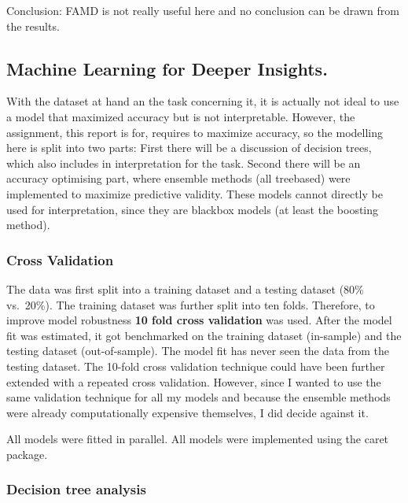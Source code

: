 \documentclass[
]{article}
\begin{document}
Conclusion: FAMD is not really useful here and no conclusion can be
drawn from the results.

\hypertarget{machine-learning-for-deeper-insights.}{%
\subsection{Machine Learning for Deeper
Insights.}\label{machine-learning-for-deeper-insights.}}

With the dataset at hand an the task concerning it, it is actually not
ideal to use a model that maximized accuracy but is not interpretable.
However, the assignment, this report is for, requires to maximize
accuracy, so the modelling here is split into two parts: First there
will be a discussion of decision trees, which also includes in
interpretation for the task. Second there will be an accuracy optimising
part, where ensemble methods (all treebased) were implemented to
maximize predictive validity. These models cannot directly be used for
interpretation, since they are blackbox models (at least the boosting
method).

\hypertarget{cross-validation}{%
\subsubsection{Cross Validation}\label{cross-validation}}

The data was first split into a training dataset and a testing dataset
(80\% vs.~20\%). The training dataset was further split into ten folds.
Therefore, to improve model robustness \textbf{10 fold cross validation}
was used. After the model fit was estimated, it got benchmarked on the
training dataset (in-sample) and the testing dataset (out-of-sample).
The model fit has never seen the data from the testing dataset. The
10-fold cross validation technique could have been further extended with
a repeated cross validation. However, since I wanted to use the same
validation technique for all my models and because the ensemble methods
were already computationally expensive themselves, I did decide against
it.

All models were fitted in parallel. All models were implemented using
the caret package.

\hypertarget{decision-tree-analysis}{%
\subsubsection{Decision tree analysis}\label{decision-tree-analysis}}
\end{document}
